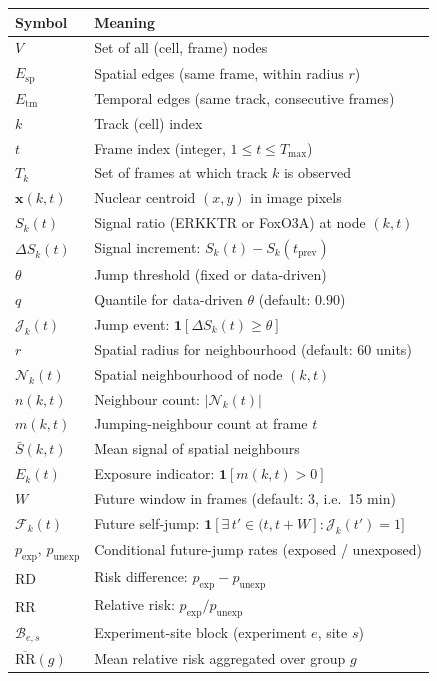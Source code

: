 \documentclass[11pt,a4paper]{article}
\theoremstyle{definition}
\theoremstyle{plain}
\newcommand{\sig}[2]{S_{#1}(#2)}
\newcommand{\dS}[2]{\Delta S_{#1}(#2)}
\newcommand{\Nb}[2]{\mathcal{N}_{#1}(#2)}
\newcommand{\JE}[2]{\mathcal{J}_{#1}(#2)}
\newcommand{\FJ}[2]{\mathcal{F}_{#1}(#2)}
\newcommand{\expo}[2]{E_{#1}(#2)}
\newcommand{\RD}{\mathrm{RD}}
\newcommand{\RR}{\mathrm{RR}}
\newcommand{\pE}{p_{\mathrm{exp}}}
\newcommand{\pU}{p_{\mathrm{unexp}}}
\newcommand{\1}[1]{\mathbf{1}\!\left[#1\right]}
\begin{document}
\begin{center}
\renewcommand{\arraystretch}{1.35}
\begin{tabular}{>{\bfseries}p{3.5cm}p{9.5cm}}
\toprule
Symbol & Meaning \\
\midrule
$V$ & Set of all (cell, frame) nodes \\
$E_{\mathrm{sp}}$ & Spatial edges (same frame, within radius $r$) \\
$E_{\mathrm{tm}}$ & Temporal edges (same track, consecutive frames) \\
$k$ & Track (cell) index \\
$t$ & Frame index (integer, $1 \leq t \leq T_{\max}$) \\
$T_k$ & Set of frames at which track $k$ is observed \\
$\bm{x}(k,t)$ & Nuclear centroid $(x,y)$ in image pixels \\
$\sig{k}{t}$ & Signal ratio (ERKKTR or FoxO3A) at node $(k,t)$ \\
$\dS{k}{t}$ & Signal increment: $\sig{k}{t} - \sig{k}{t_{\mathrm{prev}}}$ \\
$\theta$ & Jump threshold (fixed or data-driven) \\
$q$ & Quantile for data-driven $\theta$ (default: $0.90$) \\
$\JE{k}{t}$ & Jump event: $\mathbf{1}[\dS{k}{t} \geq \theta]$ \\
$r$ & Spatial radius for neighbourhood (default: 60 units) \\
$\Nb{k}{t}$ & Spatial neighbourhood of node $(k,t)$ \\
$n(k,t)$ & Neighbour count: $|\Nb{k}{t}|$ \\
$m(k,t)$ & Jumping-neighbour count at frame $t$ \\
$\bar{S}(k,t)$ & Mean signal of spatial neighbours \\
$\expo{k}{t}$ & Exposure indicator: $\mathbf{1}[m(k,t)>0]$ \\
$W$ & Future window in frames (default: 3, i.e.\ 15 min) \\
$\FJ{k}{t}$ & Future self-jump: $\mathbf{1}[\exists\,t'\in(t,t{+}W]:\JE{k}{t'}=1]$ \\
$\pE,\,\pU$ & Conditional future-jump rates (exposed / unexposed) \\
$\RD$ & Risk difference: $\pE - \pU$ \\
$\RR$ & Relative risk: $\pE / \pU$ \\
$\mathcal{B}_{e,s}$ & Experiment-site block (experiment $e$, site $s$) \\
$\overline{\RR}(g)$ & Mean relative risk aggregated over group $g$ \\
\bottomrule
\end{tabular}
\end{center}
\end{document}
